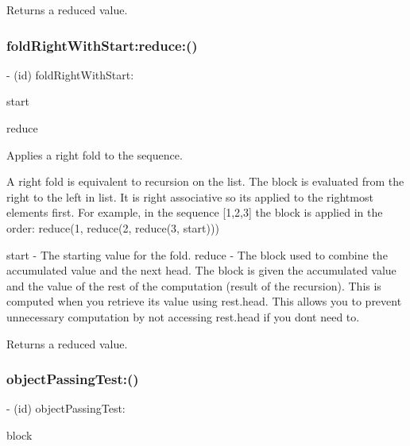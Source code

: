 Returns a reduced value. \mbox{\label{interface_r_a_c_sequence_abc932140e0279336ed6829b6f91b577e}} 
\subsubsection{\texorpdfstring{fold\+Right\+With\+Start\+:reduce\+:()}{foldRightWithStart:reduce:()}\hspace{0.1cm}{\footnotesize\ttfamily [3/3]}}
{\footnotesize\ttfamily -\/ (id) fold\+Right\+With\+Start\+: \begin{DoxyParamCaption}\item[{(id)}]{start }\item[{reduce:(id($^\wedge$)(id first, \mbox{\hyperlink{interface_r_a_c_sequence}{R\+A\+C\+Sequence}} $\ast$rest))}]{reduce }\end{DoxyParamCaption}}

Applies a right fold to the sequence.

A right fold is equivalent to recursion on the list. The block is evaluated from the right to the left in list. It is right associative so it\textquotesingle{}s applied to the rightmost elements first. For example, in the sequence \mbox{[}1,2,3\mbox{]} the block is applied in the order\+: reduce(1, reduce(2, reduce(3, start)))

start -\/ The starting value for the fold. reduce -\/ The block used to combine the accumulated value and the next head. The block is given the accumulated value and the value of the rest of the computation (result of the recursion). This is computed when you retrieve its value using {\ttfamily rest.\+head}. This allows you to prevent unnecessary computation by not accessing {\ttfamily rest.\+head} if you don\textquotesingle{}t need to.

Returns a reduced value. \mbox{\label{interface_r_a_c_sequence_a38ac274b6fbd87f0ea24f32d1a2d766b}} 
\subsubsection{\texorpdfstring{object\+Passing\+Test\+:()}{objectPassingTest:()}\hspace{0.1cm}{\footnotesize\ttfamily [1/3]}}
{\footnotesize\ttfamily -\/ (id) object\+Passing\+Test\+: \begin{DoxyParamCaption}\item[{(B\+O\+OL($^\wedge$)(id value))}]{block }\end{DoxyParamCaption}}

